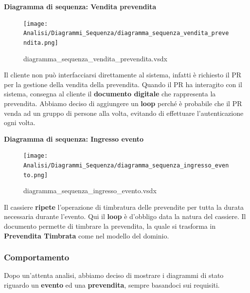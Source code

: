 \documentclass[a4paper]{article}
\begin{document}
\textbf{Diagramma di sequenza: Vendita prevendita}

\begin{figure}[H]
    \texttt{[image: Analisi/Diagrammi\_Sequenza/diagramma\_sequenza\_vendita\_prevendita.png]}
    \centering
    \caption{diagramma\_sequenza\_vendita\_prevendita.vsdx}
\end{figure}

Il cliente non può interfacciarsi direttamente al sistema, infatti è richiesto il PR per la gestione della vendita della prevendita. Quando il PR ha interagito con il sistema, consegna al cliente il \textbf{documento digitale} che rappresenta la prevendita. Abbiamo deciso di aggiungere un \textbf{loop} perché è probabile che il PR venda ad un gruppo di persone alla volta, evitando di effettuare l'autenticazione ogni volta.

\newpage

\textbf{Diagramma di sequenza: Ingresso evento}

\begin{figure}[H]
    \texttt{[image: Analisi/Diagrammi\_Sequenza/diagramma\_sequenza\_ingresso\_evento.png]}
    \centering
    \caption{diagramma\_sequenza\_ingresso\_evento.vsdx}
\end{figure}

Il cassiere \textbf{ripete} l'operazione di timbratura delle prevendite per tutta la durata necessaria durante l'evento. Qui il \textbf{loop} è d'obbligo data la natura del cassiere. Il documento permette di timbrare la prevendita, la quale si trasforma in \textbf{Prevendita Timbrata} come nel modello del dominio.

\newpage

\subsubsection{Comportamento}

Dopo un'attenta analisi, abbiamo deciso di mostrare i diagrammi di stato riguardo un \textbf{evento} ed una \textbf{prevendita}, sempre basandoci sui requisiti.


\end{document}
